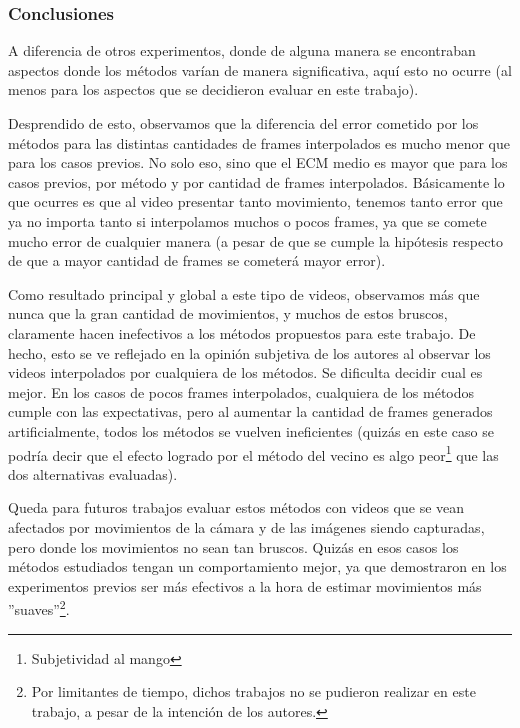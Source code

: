 \subsubsection{Conclusiones}
\par A diferencia de otros experimentos, donde de alguna manera se encontraban
aspectos donde los m\'etodos var\'ian de manera significativa, aqu\'i esto
no ocurre (al menos para los aspectos que se decidieron evaluar en este
trabajo).

\par Desprendido de esto, observamos que la diferencia del error cometido por
los m\'etodos para las distintas cantidades de frames interpolados es mucho
menor que para los casos previos. No solo eso, sino que el ECM medio es mayor
que para los casos previos, por m\'etodo y por cantidad de frames interpolados.
B\'asicamente lo que ocurres es que al video presentar tanto movimiento,
tenemos tanto error que ya no importa tanto si interpolamos muchos o pocos
frames, ya que se comete mucho error de cualquier manera (a pesar de que se
cumple la hip\'otesis respecto de que a mayor cantidad de frames se cometer\'a
mayor error).

\par Como resultado principal y global a este tipo de videos, observamos m\'as
que nunca que la gran cantidad de movimientos, y muchos de estos bruscos,
claramente hacen inefectivos a los m\'etodos propuestos para este trabajo. De
hecho, esto se ve reflejado en la opini\'on subjetiva de los autores al
observar los videos interpolados por cualquiera de los m\'etodos. Se dificulta
decidir cual es mejor. En los casos de pocos frames interpolados, cualquiera de
los m\'etodos cumple con las expectativas, pero al aumentar la cantidad de
frames generados artificialmente, todos los m\'etodos se vuelven ineficientes
(quiz\'as en este caso se podr\'ia decir que el efecto logrado por el m\'etodo
del vecino es algo peor\footnote{Subjetividad al mango} que las dos
alternativas evaluadas).

\par Queda para futuros trabajos evaluar estos m\'etodos con videos que se vean
afectados por movimientos de la c\'amara y de las im\'agenes siendo capturadas,
pero donde los movimientos no sean tan bruscos. Quiz\'as en esos casos los
m\'etodos estudiados tengan un comportamiento mejor, ya que demostraron en los
experimentos previos ser m\'as efectivos a la hora de estimar movimientos m\'as
''suaves''\footnote{Por limitantes de tiempo, dichos trabajos no se pudieron
realizar en este trabajo, a pesar de la intenci\'on de los autores.}.

